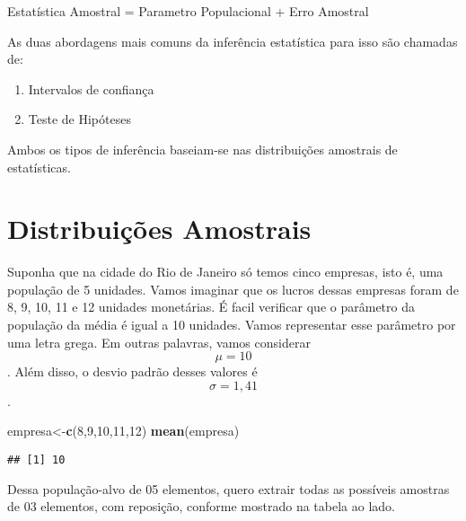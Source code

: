 \documentclass[]{book}
\newenvironment{Shaded}{\begin{snugshade}}{\end{snugshade}}
\newcommand{\KeywordTok}[1]{\textcolor[rgb]{0.13,0.29,0.53}{\textbf{#1}}}
\newcommand{\DecValTok}[1]{\textcolor[rgb]{0.00,0.00,0.81}{#1}}
\newcommand{\NormalTok}[1]{#1}
\providecommand{\tightlist}{%
  \setlength{\itemsep}{0pt}\setlength{\parskip}{0pt}}
\theoremstyle{definition}
\theoremstyle{definition}
\theoremstyle{definition}
\theoremstyle{remark}
\begin{document}
Estatística Amostral = Parametro Populacional + Erro Amostral

As duas abordagens mais comuns da inferência estatística para isso são
chamadas de:

\begin{enumerate}
\def\labelenumi{\arabic{enumi}.}
\tightlist
\item
  Intervalos de confiança
\item
  Teste de Hipóteses
\end{enumerate}

Ambos os tipos de inferência baseiam-se nas distribuições amostrais de
estatísticas.

\section{Distribuições Amostrais}\label{distribuicoes-amostrais}

Suponha que na cidade do Rio de Janeiro só temos cinco empresas, isto é,
uma população de 5 unidades. Vamos imaginar que os lucros dessas
empresas foram de 8, 9, 10, 11 e 12 unidades monetárias. É facil
verificar que o parâmetro da população da média é igual a 10 unidades.
Vamos representar esse parâmetro por uma letra grega. Em outras
palavras, vamos considerar \[\mu=10\]. Além disso, o desvio padrão
desses valores é \[ \sigma=1,41\].

\begin{Shaded}
\begin{Highlighting}[]
\NormalTok{empresa<-}\KeywordTok{c}\NormalTok{(}\DecValTok{8}\NormalTok{,}\DecValTok{9}\NormalTok{,}\DecValTok{10}\NormalTok{,}\DecValTok{11}\NormalTok{,}\DecValTok{12}\NormalTok{)}
\KeywordTok{mean}\NormalTok{(empresa)}
\end{Highlighting}
\end{Shaded}

\begin{verbatim}
## [1] 10
\end{verbatim}

Dessa população-alvo de 05 elementos, quero extrair todas as possíveis
amostras de 03 elementos, com reposição, conforme mostrado na tabela ao
lado.
\end{document}
